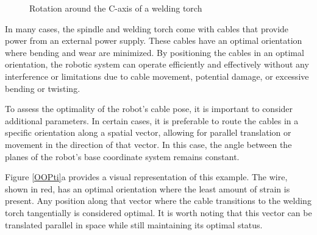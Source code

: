 \begin{figure}[H]%
	\centering
	\qquad
	\caption{Rotation around the C-axis of a welding torch }%
	\label{rot}%
\end{figure}

In many cases, the spindle and welding torch come with cables that provide power from an external power supply. These cables have an optimal orientation where bending and wear are minimized. By positioning the cables in an optimal orientation, the robotic system can operate efficiently and effectively without any interference or limitations due to cable movement, potential damage, or excessive bending or twisting.

To assess the optimality of the robot's cable pose, it is important to consider additional parameters. In certain cases, it is preferable to route the cables in a specific orientation along a spatial vector, allowing for parallel translation or movement in the direction of that vector. In this case, the angle between the planes of the robot's base coordinate system remains constant.

Figure \ref{OOPti}a provides a visual representation of this example. The wire, shown in red, has an optimal orientation where the least amount of strain is present. Any position along that vector where the cable transitions to the welding torch tangentially is considered optimal. It is worth noting that this vector can be translated parallel in space while still maintaining its optimal status.

